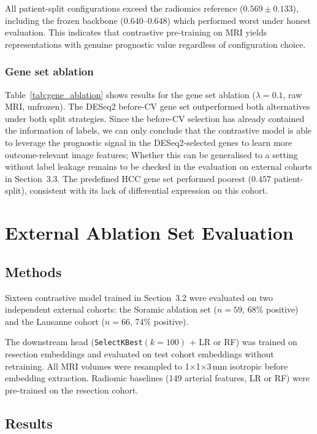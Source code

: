 \documentclass[12pt,twoside]{report}
\begin{document}
All patient-split configurations exceed the radiomics reference ($0.569 \pm 0.133$),
including the frozen backbone ($0.640$--$0.648$) which performed worst under honest evaluation.
This indicates that contrastive pre-training on MRI yields representations with genuine
prognostic value regardless of configuration choice.

\subsubsection*{Gene set ablation}

Table~\ref{tab:gene_ablation} shows results for the gene set ablation ($\lambda=0.1$, raw MRI,
unfrozen).
The DESeq2 before-CV gene set outperformed both alternatives under both split strategies.
Since the before-CV selection has already contained the information of labels, we can only conclude that the contrastive model is able to leverage the prognostic signal in the DESeq2-selected genes to learn more outcome-relevant image features;
Whether this can be generalised to a setting without label leakage remains to be checked in the evaluation on external cohorts in Section~3.3.
The predefined HCC gene set performed poorest ($0.457$ patient-split), consistent with
its lack of differential expression on this cohort.


\section{External Ablation Set Evaluation}

\subsection*{Methods}

Sixteen contrastive model trained in Section~3.2 were evaluated on two independent external cohorts:
the Soramic ablation set ($n=59$, 68\% positive) and the Lausanne cohort ($n=66$, 74\% positive).

The downstream head (\texttt{SelectKBest}$(k=100)$ + LR or RF) was trained on resection embeddings
and evaluated on test cohort embeddings without retraining.
All MRI volumes were resampled to 1$\times$1$\times$3\,mm isotropic before embedding extraction.
Radiomic baselines (149 arterial features, LR or RF) were pre-trained on the resection cohort.

\subsection*{Results}
\end{document}
